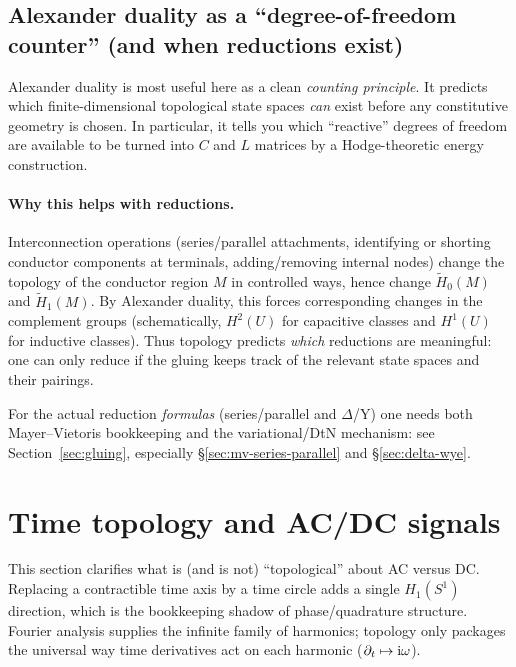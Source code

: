 \documentclass[11pt]{article}
\begin{document}
\subsection{Alexander duality as a ``degree-of-freedom counter'' (and when reductions exist)}
\label{sec:alexander-series-parallel}
Alexander duality is most useful here as a clean \emph{counting principle}.
It predicts which finite-dimensional topological state spaces \emph{can} exist before any constitutive geometry is chosen.
In particular, it tells you which ``reactive'' degrees of freedom are available to be turned into $C$ and $L$ matrices by a Hodge-theoretic energy construction.

\paragraph{Why this helps with reductions.}
Interconnection operations (series/parallel attachments, identifying or shorting conductor components at terminals, adding/removing internal nodes) change the topology of the conductor region $M$ in controlled ways, hence change $\widetilde H_0(M)$ and $\widetilde H_1(M)$.
By Alexander duality, this forces corresponding changes in the complement groups (schematically, $H^2(U)$ for capacitive classes and $H^1(U)$ for inductive classes).
Thus topology predicts \emph{which} reductions are meaningful: one can only reduce if the gluing keeps track of the relevant state spaces and their pairings.

For the actual reduction \emph{formulas} (series/parallel and $\Delta$/Y) one needs both Mayer--Vietoris bookkeeping and the variational/DtN mechanism:
see Section~\ref{sec:gluing}, especially \S\ref{sec:mv-series-parallel} and \S\ref{sec:delta-wye}.

\section{Time topology and AC/DC signals}
\label{sec:time-topology}
This section clarifies what is (and is not) ``topological'' about AC versus DC.
Replacing a contractible time axis by a time circle adds a single $H_1(S^1)$ direction, which is the bookkeeping shadow of phase/quadrature structure.
Fourier analysis supplies the infinite family of harmonics; topology only packages the universal way time derivatives act on each harmonic ($\partial_t\mapsto \mathrm{i}\omega$).
\end{document}
